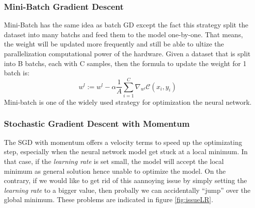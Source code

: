 \subsubsection{Mini-Batch Gradient Descent}
Mini-Batch has the same idea as batch GD except the fact this strategy split the dataset into many batchs and feed them to the model one-by-one. That means, the weight will be updated more frequently and still be able to ultize the parallelization computational power of the hardware. Given a dataset that is split into B batchs, each with C samples, then the formula to update the weight for 1 batch is:
\begin{equation}
    w^{l} := w^{l} - \alpha \frac{1}{A} \sum^{C}_{i=1} \nabla_{w^{l}} \mathcal{C}(x_{i},y_{i})
\end{equation}
Mini-batch is one of the widely used strategy for optimization the neural network.
\subsubsection{Stochastic Gradient Descent with Momentum}
The SGD with momentum offers a velocity terms to speed up the optimizating step, especially when the neural network model get stuck at a local minimum. In that case, if the \textit{learning rate} is set small, the model will accept the local minimum as general solution hence unable to optimize the model. On the contrary, if we would like to get rid of this aannoying issue by simply setting the \textit{learning rate} to a bigger value, then probally we can accidentally ``jump'' over the global minimum. These problems are indicated in figure \ref{fig:issueLR}.

